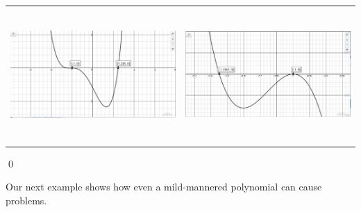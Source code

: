 \documentclass{ximera}
\begin{document}
\begin{example}
\begin{center}
\begin{tabular}{cc}
\includegraphics[width = 3in, height=2in]{./RealZerosGraphics/RealZerosEx01a.jpg}  &\includegraphics[width = 3in, height=2in]{./RealZerosGraphics/RealZerosEx01b.jpg}

\end{tabular}
\end{center}

 \qed

\end{example}


Our next example shows how even a mild-mannered polynomial can cause problems.
\end{document}
